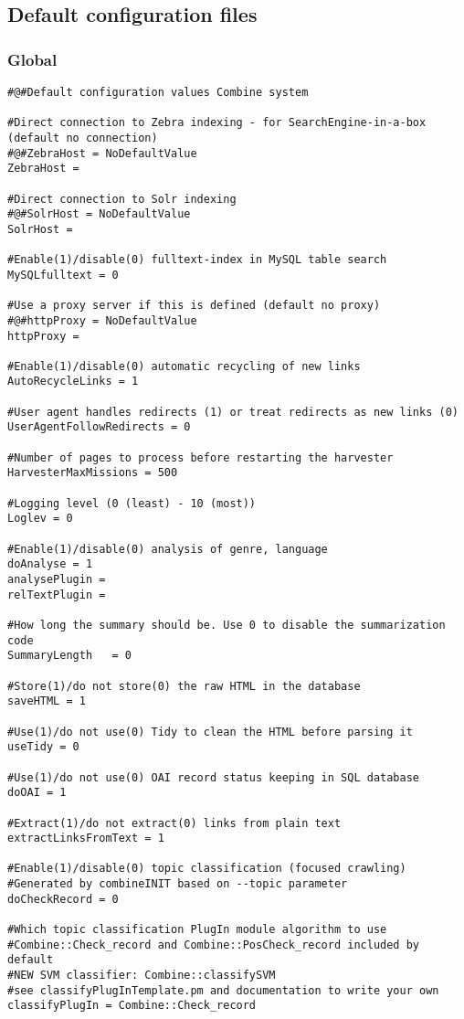 \subsection{Default configuration files}

\label{conffiles}
\subsubsection{Global}

\begin{verbatim}
#@#Default configuration values Combine system

#Direct connection to Zebra indexing - for SearchEngine-in-a-box (default no connection)
#@#ZebraHost = NoDefaultValue
ZebraHost =

#Direct connection to Solr indexing
#@#SolrHost = NoDefaultValue
SolrHost =

#Enable(1)/disable(0) fulltext-index in MySQL table search
MySQLfulltext = 0

#Use a proxy server if this is defined (default no proxy)
#@#httpProxy = NoDefaultValue
httpProxy =

#Enable(1)/disable(0) automatic recycling of new links
AutoRecycleLinks = 1

#User agent handles redirects (1) or treat redirects as new links (0)
UserAgentFollowRedirects = 0

#Number of pages to process before restarting the harvester
HarvesterMaxMissions = 500

#Logging level (0 (least) - 10 (most))
Loglev = 0

#Enable(1)/disable(0) analysis of genre, language
doAnalyse = 1
analysePlugin =
relTextPlugin =

#How long the summary should be. Use 0 to disable the summarization code
SummaryLength   = 0

#Store(1)/do not store(0) the raw HTML in the database
saveHTML = 1

#Use(1)/do not use(0) Tidy to clean the HTML before parsing it
useTidy = 0

#Use(1)/do not use(0) OAI record status keeping in SQL database
doOAI = 1

#Extract(1)/do not extract(0) links from plain text
extractLinksFromText = 1

#Enable(1)/disable(0) topic classification (focused crawling)
#Generated by combineINIT based on --topic parameter
doCheckRecord = 0

#Which topic classification PlugIn module algorithm to use
#Combine::Check_record and Combine::PosCheck_record included by default
#NEW SVM classifier: Combine::classifySVM
#see classifyPlugInTemplate.pm and documentation to write your own
classifyPlugIn = Combine::Check_record


\end{verbatim}
